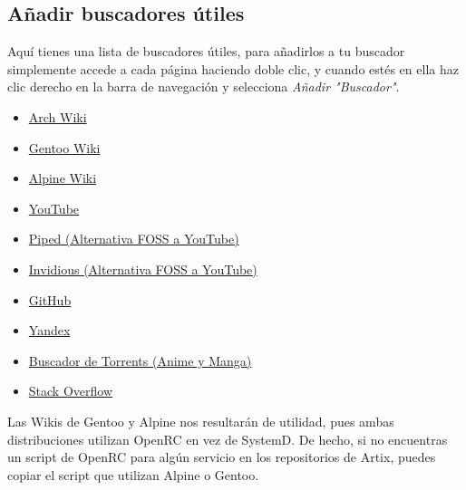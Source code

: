 \documentclass[12pt]{article}
\begin{document}
\subsection{Añadir buscadores útiles}

Aquí tienes una lista de buscadores útiles, para añadirlos a tu buscador simplemente accede a cada página haciendo doble clic, y cuando estés en ella haz clic derecho en la barra de navegación y selecciona \emph{Añadir "Buscador"}.

\begin{multicols}{2}
\begin{itemize}
\setlength\itemindent{-0.5em}
\setlength\itemsep{-0.35em}
\item \href{https://wiki.archlinux.org/}{Arch Wiki}
\item \href{https://wiki.gentoo.org/wiki/Main_Page}{Gentoo Wiki}
\item \href{https://wiki.alpinelinux.org/wiki/Main_Page}{Alpine Wiki}
\item \href{https://www.youtube.com/}{YouTube}
\item \href{https://nyc1.pi.ggtyler.dev/trending}{Piped (Alternativa FOSS a YouTube)}
\item \href{https://iv.ggtyler.dev/feed/popular}{Invidious (Alternativa FOSS a YouTube)}
\item \href{https://github.com/}{GitHub}
\item \href{https://yandex.com/}{Yandex}
\item \href{https://nyaa.si/}{Buscador de Torrents (Anime y Manga)}
\item \href{https://stackoverflow.com/}{Stack Overflow}
\end{itemize}
\end{multicols}

Las Wikis de Gentoo y Alpine nos resultarán de utilidad, pues ambas distribuciones utilizan OpenRC en vez de SystemD. De hecho, si no encuentras un script de OpenRC para algún servicio en los repositorios de Artix, puedes copiar el script que utilizan Alpine o Gentoo.
\end{document}
